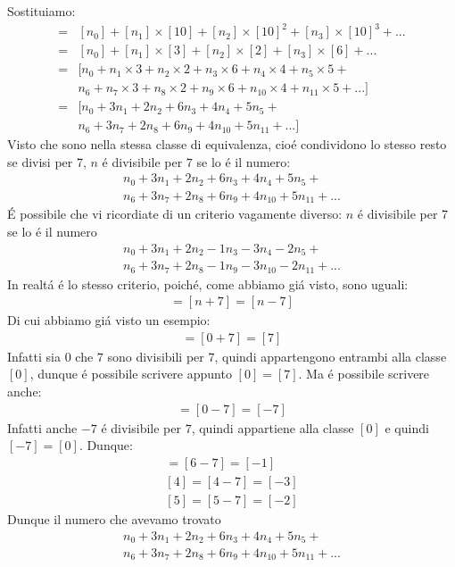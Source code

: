 \documentclass[twoside]{article} %
\begin{document}
	Sostituiamo:
	\begin{align*}
		[n]=&[n_0]+[n_1]\times [10]+[n_2]\times [10]^2+[n_3]\times [10]^3+...\\
		   =&[n_0]+[n_1]\times [3]+[n_2]\times [2]+[n_3]\times [6]+...\\
		   =&[n_0+n_1\times 3+n_2\times 2+n_3\times 6+n_4\times 4+n_5\times 5+\\
		   &n_6+n_7\times 3+n_8\times 2+n_9\times 6+n_{10}\times 4+n_{11}\times 5+...]\\
		   =&[n_0+3n_1+2n_2+6n_3+4n_4+5n_5+\\
		   &n_6+3n_7+2n_8+6n_9+4n_{10}+5n_{11}+...]
	\end{align*}
	\newpage
	\noindent Visto che sono nella stessa classe di equivalenza, cio\'e condividono lo stesso resto se divisi per 7, $n$ \'e divisibile per $7$ se lo \'e il numero:
	\begin{gather*}
		n_0+3n_1+2n_2+6n_3+4n_4+5n_5+\\
		n_6+3n_7+2n_8+6n_9+4n_{10}+5n_{11}+...
	\end{gather*}
	\'E possibile che vi ricordiate di un criterio vagamente diverso: $n$ \'e divisibile per 7 se lo \'e il numero
	\begin{gather*}
		n_0+3n_1+2n_2-1n_3-3n_4-2n_5+\\
		n_6+3n_7+2n_8-1n_9-3n_{10}-2n_{11}+...
	\end{gather*}	
	In realt\'a \'e lo stesso criterio, poich\'e, come abbiamo gi\'a visto, sono uguali:
	\begin{gather*}
		[n]=[n+7]=[n-7]
	\end{gather*}
	Di cui abbiamo gi\'a visto un esempio:
	\begin{gather*}
		[0]=[0+7]=[7]
	\end{gather*}
	Infatti sia $0$ che $7$ sono divisibili per $7$, quindi appartengono entrambi alla classe $[0]$, dunque \'e possibile scrivere appunto $[0]=[7]$. Ma \'e possibile scrivere anche:
	\begin{gather*}
		[0]=[0-7]=[-7]
	\end{gather*}
	Infatti anche $-7$ \'e divisibile per $7$, quindi appartiene alla classe $[0]$ e quindi $[-7]=[0]$. Dunque:
	\begin{gather*}
		[6]=[6-7]=[-1]\\
		[4]=[4-7]=[-3]\\
		[5]=[5-7]=[-2]
	\end{gather*}
	Dunque il numero che avevamo trovato
		\begin{gather*}
		n_0+3n_1+2n_2+6n_3+4n_4+5n_5+\\
		n_6+3n_7+2n_8+6n_9+4n_{10}+5n_{11}+...
	\end{gather*}
\end{document}
